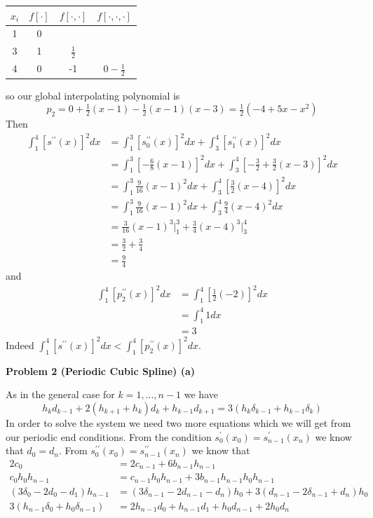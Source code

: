 \documentclass[12pt]{article}
\newcommand{\problem}[1]{\hspace{-4 ex} \large \textbf{Problem #1} }
\begin{document}
	\begin{center}
		\begin{tabular}{|c|c|c|c|}\hline
			$x_i$ & $f[\cdot]$ & $f[\cdot,\cdot]$ & $f[\cdot,\cdot,\cdot]$ \\ \hline
			1 & 0 & & \\ \hline
			3 & 1 & $\tfrac{1}{2}$ &\\ \hline
			4 & 0 & -1 & $0-\tfrac{1}{2}$ \\ \hline
		\end{tabular}
	\end{center}
	so our global interpolating polynomial is 
	$$
	p_2 = 0 + \tfrac{1}{2}(x-1) - \tfrac{1}{2}(x-1)(x-3) = \tfrac{1}{2}(-4+5x-x^2)
	$$
	Then
	\begin{align*}
		\int_1^4 [s^{\prime\prime}(x)]^2 dx & = \int_1^3 [s_0^{\prime\prime}(x)]^2 dx + \int_3^4 [s_1^{\prime\prime}(x)]^2 dx \\
		& = \int_1^3 [-\tfrac{6}{8}(x-1)]^2 dx + \int_3^4 [-\tfrac{3}{2} + \tfrac{3}{2}(x-3)]^2 dx \\
		& = \int_1^3 \tfrac{9}{16}(x-1)^2 dx + \int_3^4 [\tfrac{3}{2}(x-4)]^2 dx \\
		& = \int_1^3 \tfrac{9}{16}(x-1)^2 dx + \int_3^4 \tfrac{9}{4}(x-4)^2 dx \\
		& = \tfrac{3}{16}(x-1)^3 \Big\vert_1^3 + \tfrac{3}{4}(x-4)^3 \Big\vert_3^4 \\
		& = \tfrac{3}{2} + \tfrac{3}{4} \\
		& = \tfrac{9}{4}
	\end{align*}
	and 
	\begin{align*}
		\int_1^4 [p_2^{\prime\prime}(x)]^2 dx & = \int_1^4 [\tfrac{1}{2}(-2)]^2 dx \\
		& = \int_1^4 1 dx \\
		& = 3
	\end{align*}
	Indeed $\int_1^4 [s^{\prime\prime}(x)]^2 dx < \int_1^4 [p_2^{\prime\prime}(x)]^2 dx$.
	
\problem{2 (Periodic Cubic Spline) (a)}
	
	As in the general case for $k = 1, ..., n-1$ we have
	$$
	h_kd_{k-1} + 2(h_{k+1} + h_{k})d_k + h_{k-1}d_{k+1} = 3(h_k\delta_{k-1} + h_{k-1}\delta_{k})
	$$
	In order to solve the system we need two more equations which we will get from our periodic end conditions. From the condition $s_0^\prime(x_0) = s_{n-1}^\prime(x_n)$ we know that $d_0 = d_n$. From $s_0^{\prime\prime}(x_0) = s_{n-1}^{\prime\prime}(x_n)$ we know that
	\begin{align*}
		2c_0 & = 2c_{n-1} + 6b_{n-1}h_{n-1} \\
		c_0h_0h_{n-1} & = c_{n-1}h_0h_{n-1} + 3b_{n-1}h_{n-1}h_0h_{n-1} \\
		(3\delta_0 - 2d_0 - d_1)h_{n-1} & = (3\delta_{n-1} - 2d_{n-1} - d_n)h_{0} + 3(d_{n-1} -2\delta_{n-1} + d_n)h_{0} \\
		3(h_{n-1}\delta_0 + h_0\delta_{n-1}) & = 2h_{n-1} d_0 + h_{n-1}d_1 + h_0d_{n-1} + 2h_0d_n 
	\end{align*}
	
\end{document}

